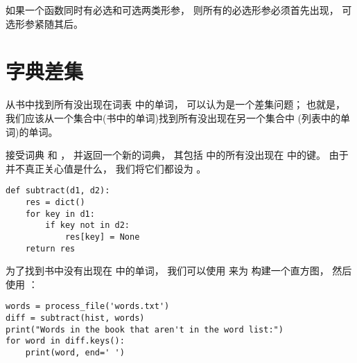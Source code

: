 如果一个函数同时有必选和可选两类形参， 则所有的必选形参必须首先出现， 可选形参紧随其后。

\section{字典差集}

\label{dictsub}


从书中找到所有没出现在词表  中的单词， 可以认为是一个差集问题；
也就是， 我们应该从一个集合中(书中的单词)找到所有没出现在另一个集合中
(列表中的单词)的单词。


 接受词典  和  ， 并返回一个新的词典，
其包括  中的所有没出现在  中的键。
由于并不真正关心值是什么， 我们将它们都设为 。

\begin{lstlisting}
def subtract(d1, d2):
    res = dict()
    for key in d1:
        if key not in d2:
            res[key] = None
    return res
\end{lstlisting}


为了找到书中没有出现在  中的单词，
我们可以使用  来为  构建一个直方图，
然后使用  ：

\begin{lstlisting}
words = process_file('words.txt')
diff = subtract(hist, words)
print("Words in the book that aren't in the word list:")
for word in diff.keys():
    print(word, end=' ')
\end{lstlisting}

